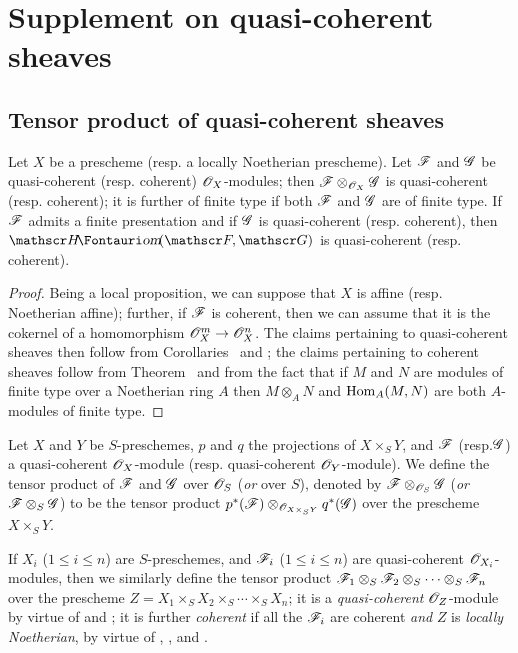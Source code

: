\section{Supplement on quasi-coherent sheaves}
\label{section:supplement-on-qcoh}

\subsection{Tensor product of quasi-coherent sheaves}
\label{subsection:tensor-product-of-qcoh}

\begin{prop}[9.1.1]
\label{1.9.1.1}
Let $X$ be a prescheme (resp. a locally Noetherian prescheme). Let $\mathscr{F}$ and
$\mathscr{G}$ be quasi-coherent (resp. coherent) $\mathscr{O}_X$-modules; then
$\mathscr{F}\otimes_{\mathscr{O}_X}\mathscr{G}$ is quasi-coherent (resp. coherent); it is further
of finite type if both $\mathscr{F}$ and $\mathscr{G}$ are of finite type. If
$\mathscr{F}$ admits a finite presentation and if $\mathscr{G}$ is quasi-coherent
(resp. coherent), then $\shHom(\sh{F},\sh{G})$ is quasi-coherent
(resp. coherent).
\end{prop}

\begin{proof}
\label{proof-1.9.1.1}
Being a local proposition, we can suppose that $X$ is affine (resp. Noetherian
affine); further, if $\mathscr{F}$ is coherent, then we can assume that it is the
cokernel of a homomorphism $\OO_X^m\to\OO_X^n$. The claims pertaining to
quasi-coherent sheaves then follow from Corollaries~ and ; the
claims pertaining to coherent sheaves follow from Theorem~ and from the fact
that if $M$ and $N$ are modules of finite type over a Noetherian ring $A$
then $M\otimes_A N$ and ${\mathop{\mathrm{Hom}}\nolimits}_A(M,N)$ are both $A$-modules of finite type.
\end{proof}

\begin{defn}[9.1.2]
\label{1.9.1.2}
Let $X$ and $Y$ be $S$-preschemes, $p$ and
$q$ the projections of $X\times_S Y$, and $\mathscr{F}$ (resp.$\mathscr{G}$) a
quasi-coherent $\mathscr{O}_X$-module (resp. quasi-coherent $\mathscr{O}_Y$-module). We define the
tensor product of $\mathscr{F}$ and $\mathscr{G}$ over $\mathscr{O}_S$ (\emph{or} over $S$),
denoted by $\mathscr{F}\otimes_{\mathscr{O}_S}\mathscr{G}$ (\emph{or}
$\mathscr{F}\otimes_S\mathscr{G}$) to be the tensor product
$p^*(\mathscr{F})\otimes_{\mathscr{O}_{X\times_S Y}}q^*(\mathscr{G})$ over the
prescheme $X\times_S Y$.
\end{defn}

If $X_i$ ($1\leq i\leq n$) are $S$-preschemes, and $\mathscr{F}_i$ ($1\leq i\leq n$) are quasi-coherent
$\mathscr{O}_{X_i}$-modules, then we similarly define the tensor product
$\mathscr{F}_1\otimes_S\mathscr{F}_2\otimes_S\cdots\otimes_S\mathscr{F}_n$ over the
prescheme $Z=X_1\times_S X_2\times_S\cdots\times_S X_n$; it is a
\emph{quasi-coherent} $\mathscr{O}_Z$-module by virtue of  and
; it is further \emph{coherent} if all the $\mathscr{F}_i$ are coherent \emph{and}
$Z$ is \emph{locally Noetherian}, by virtue of ,
, and .

